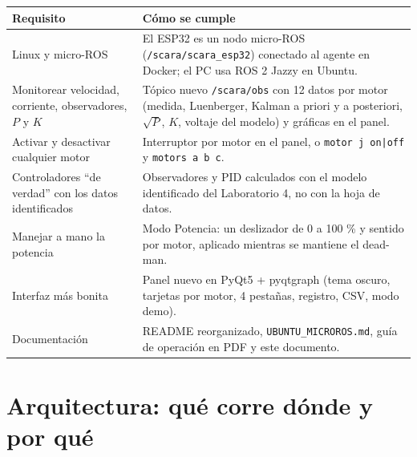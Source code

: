 \documentclass[11pt]{article}
\newcommand{\cod}[1]{\texttt{#1}}
\begin{document}
\begin{table}[H]\centering\small
\begin{tabular}{>{\raggedright\arraybackslash}p{4.6cm}>{\raggedright\arraybackslash}p{11cm}}
\toprule
Requisito & Cómo se cumple \\
\midrule
Linux y micro-ROS & El ESP32 es un nodo micro-ROS (\cod{/scara/scara\_esp32}) conectado al agente en Docker; el PC usa ROS 2 Jazzy en Ubuntu. \\
Monitorear velocidad, corriente, observadores, $P$ y $K$ & Tópico nuevo \cod{/scara/obs} con 12 datos por motor (medida, Luenberger, Kalman a priori y a posteriori, $\sqrt{P}$, $K$, voltaje del modelo) y gráficas en el panel. \\
Activar y desactivar cualquier motor & Interruptor por motor en el panel, o \cod{motor j on|off} y \cod{motors a b c}. \\
Controladores ``de verdad'' con los datos identificados & Observadores y PID calculados con el modelo identificado del Laboratorio 4, no con la hoja de datos. \\
Manejar a mano la potencia & Modo Potencia: un deslizador de 0 a 100 \% y sentido por motor, aplicado mientras se mantiene el dead-man. \\
Interfaz más bonita & Panel nuevo en PyQt5 + pyqtgraph (tema oscuro, tarjetas por motor, 4 pestañas, registro, CSV, modo demo). \\
Documentación & README reorganizado, \cod{UBUNTU\_MICROROS.md}, guía de operación en PDF y este documento. \\
\bottomrule
\end{tabular}
\end{table}

\section{Arquitectura: qué corre dónde y por qué}
\end{document}
